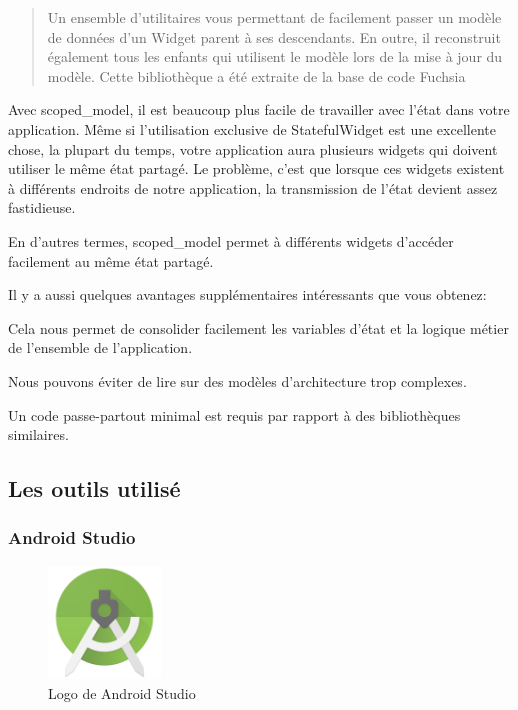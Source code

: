 \begin{quote}
Un ensemble d’utilitaires vous permettant de facilement passer un modèle de données d’un Widget parent à ses descendants. En outre, il reconstruit également tous les enfants qui utilisent le modèle lors de la mise à jour du modèle. Cette bibliothèque a été extraite de la base de code Fuchsia
\end{quote}

Avec scoped\_model, il est beaucoup plus facile de travailler avec l’état dans votre application.
Même si l'utilisation exclusive de StatefulWidget est une excellente chose, la plupart du temps, votre application aura plusieurs widgets qui doivent utiliser le même état partagé. Le problème, c’est que lorsque ces widgets existent à différents endroits de notre application, la transmission de l’état devient assez fastidieuse.

En d'autres termes, scoped\_model permet à différents widgets d'accéder facilement au même état partagé.

Il y a aussi quelques avantages supplémentaires intéressants que vous obtenez:

\begin{list}{•}{}
\item Cela nous permet de consolider facilement les variables d'état et la logique métier de l'ensemble de l'application.
\item Nous pouvons éviter de lire sur des modèles d'architecture trop complexes.
\item Un code passe-partout minimal est requis par rapport à des bibliothèques similaires.
\end{list}

\newpage

\subsection{Les outils utilisé}

\subsubsection{Android Studio}

\begin{figure}
	\vspace{-10pt}
	\includegraphics[width=3cm]{Images/chapter3/android_studio_icon.png}
	\vspace{-10pt}
	\caption{{\footnotesize Logo de Android Studio}}
\end{figure}


